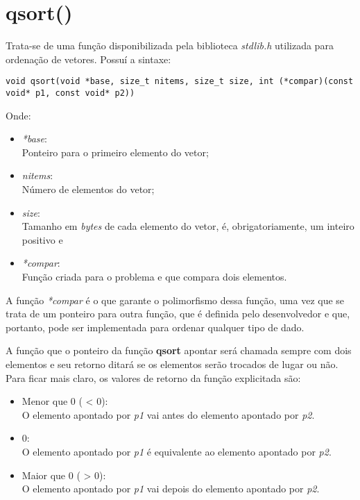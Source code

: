 \section{\normalsize qsort()}
	Trata-se de uma função disponibilizada pela biblioteca \textit{stdlib.h} utilizada para ordenação de vetores. Possuí a sintaxe:
	\begin{lstlisting}[style=C]
void qsort(void *base, size_t nitems, size_t size, int (*compar)(const void* p1, const void* p2))
\end{lstlisting}
	
	Onde:
	\begin{itemize}
		\item \textit{*base}:\\Ponteiro para o primeiro elemento do vetor;
		\item \textit{nitems}:\\Número de elementos do vetor;
		\item \textit{size}:\\Tamanho em \textit{bytes} de cada elemento do vetor, é, obrigatoriamente, um inteiro positivo e
		\item \textit{*compar}:\\Função criada para o problema e que compara dois elementos.
	\end{itemize}
	
	A função \textit{*compar} é o que garante o polimorfismo dessa função, uma vez que se trata de um ponteiro para outra função, que é definida pelo desenvolvedor e que, portanto, pode ser implementada para ordenar qualquer tipo de dado.
	
	A função que o ponteiro da função \textbf{qsort} apontar será chamada sempre com dois elementos e seu retorno ditará se os elementos serão trocados de lugar ou não. Para ficar mais claro, os valores de retorno da função explicitada são:
	\begin{itemize}
		\item Menor que 0 ( < 0):\\O elemento apontado por \textit{p1} vai antes do elemento apontado por \textit{p2}.
		\item 0:\\O elemento apontado por \textit{p1} é equivalente ao elemento apontado por \textit{p2}.
		\item Maior que 0 ( > 0):\\O elemento apontado por \textit{p1} vai depois do elemento apontado por \textit{p2}.
	\end{itemize}